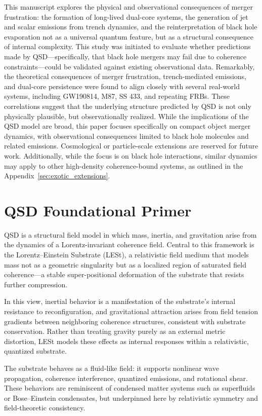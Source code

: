 \documentclass[sn-mathphys]{sn-jnl}
\theoremstyle{thmstyleone}%
\theoremstyle{thmstyletwo}%
\theoremstyle{thmstylethree}%
\begin{document}
This manuscript explores the physical and observational consequences of merger frustration: the formation of long-lived dual-core systems, the generation of jet and scalar emissions from trench dynamics, and the reinterpretation of black hole evaporation not as a universal quantum feature, but as a structural consequence of internal complexity. This study was initiated to evaluate whether predictions made by QSD—specifically, that black hole mergers may fail due to coherence constraints—could be validated against existing observational data. Remarkably, the theoretical consequences of merger frustration, trench-mediated emissions, and dual-core persistence were found to align closely with several real-world systems, including GW190814, M87, SS 433, and repeating FRBs. These correlations suggest that the underlying structure predicted by QSD is not only physically plausible, but observationally realized.
While the implications of the QSD model are broad, this paper focuses specifically on compact object merger dynamics, with observational consequences limited to black hole molecules and related emissions. Cosmological or particle-scale extensions are reserved for future work.
Additionally, while the focus is on black hole interactions, similar dynamics may apply to other high-density coherence-bound systems, as outlined in the Appendix~\ref{sec:exotic_extensions}.


\section{QSD Foundational Primer}

QSD is a structural field model in which mass, inertia, and gravitation arise from the dynamics of a Lorentz-invariant coherence field. Central to this framework is the Lorentz--Einstein Substrate (LESt), a relativistic field medium that models mass not as a geometric singularity but as a localized region of saturated field coherence—a stable super-positional deformation of the substrate that resists further compression.

In this view, inertial behavior is a manifestation of the substrate's internal resistance to reconfiguration, and gravitational attraction arises from field tension gradients between neighboring coherence structures, consistent with substrate conservation. Rather than treating gravity purely as an external metric distortion, LESt models these effects as internal responses within a relativistic, quantized substrate.

The substrate behaves as a fluid-like field: it supports nonlinear wave propagation, coherence interference, quantized emissions, and rotational shear. These behaviors are reminiscent of condensed matter systems such as superfluids or Bose–Einstein condensates, but underpinned here by relativistic symmetry and field-theoretic consistency\cite{Landau1987}.
\end{document}
